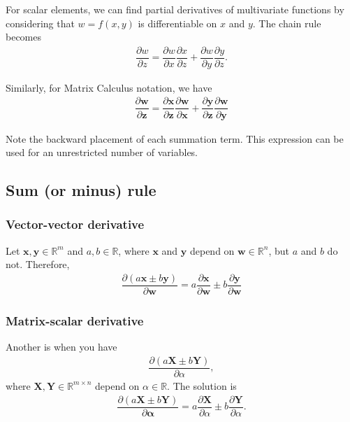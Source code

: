 For scalar elements, we can find partial derivatives of multivariate functions by considering that \(w = f(x, y)\) is differentiable on \(x\) and \(y\). The chain rule becomes
\begin{align}
    \dfrac{\partial w}{\partial z} = \dfrac{\partial w}{\partial x} \dfrac{\partial x}{\partial z} + \dfrac{\partial w}{\partial y} \dfrac{\partial y}{\partial z}.
\end{align}

Similarly, for Matrix Calculus notation, we have
\begin{align}
    \label{eq:chain-multi-inter}
    \dfrac{\partial \mathbf{w}}{\partial \mathbf{z}} = \dfrac{\partial \mathbf{x}}{\partial \mathbf{z}} \dfrac{\partial \mathbf{w}}{\partial \mathbf{x}} + \dfrac{\partial \mathbf{y}}{\partial \mathbf{z}} \dfrac{\partial \mathbf{w}}{\partial \mathbf{y}}
\end{align}

Note the backward placement of each summation term. This expression can be used for an unrestricted number of variables.

\subsection{Sum (or minus) rule}
\subsubsection{Vector-vector derivative}
Let \(\mathbf{x}, \mathbf{y} \in \mathbb{R}^{m}\) and \(a, b \in \mathbb{R}\), where \(\mathbf{x}\) and \(\mathbf{y}\) depend on \(\mathbf{w} \in \mathbb{R}^{n}\), but \(a\) and \(b\) do not. Therefore,
\begin{align}
    \dfrac{\partial (a\mathbf{x} \pm b\mathbf{y})}{\partial\mathbf{w}} = a\dfrac{\partial \mathbf{x}}{\partial\mathbf{w}} \pm b\dfrac{\partial \mathbf{y}}{\partial\mathbf{w}}
\end{align}
\subsubsection{Matrix-scalar derivative}
Another is when you have
\begin{align}
    \dfrac{\partial \left( a\mathbf{X} \pm b\mathbf{Y} \right)}{\partial \alpha},
\end{align}
where \(\mathbf{X}, \mathbf{Y} \in \mathbb{R}^{m \times n}\) depend on \(\alpha \in \mathbb{R}\). The solution is
\begin{align}
    \dfrac{\partial (a\mathbf{X} \pm b\mathbf{Y})}{\partial\mathbf{\alpha}} = a\dfrac{\partial \mathbf{X}}{\partial \alpha} \pm b \dfrac{\partial \mathbf{Y}}{\partial \alpha}.
\end{align}
